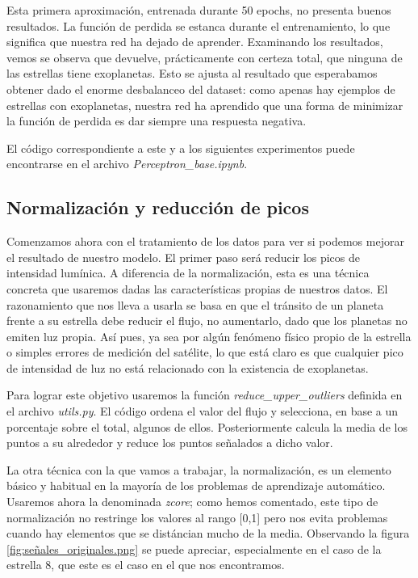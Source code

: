 Esta primera aproximación, entrenada durante 50 epochs, no presenta buenos resultados. La función de perdida se estanca durante el entrenamiento, lo que significa que nuestra red ha dejado de aprender. Examinando los resultados, vemos se observa que devuelve, prácticamente con certeza total, que ninguna de las estrellas tiene exoplanetas. Esto se ajusta al resultado que esperabamos obtener dado el enorme desbalanceo del dataset: como apenas hay ejemplos de estrellas con exoplanetas, nuestra red ha aprendido que una forma de minimizar la función de perdida es dar siempre una respuesta negativa.


El código correspondiente a este y a los siguientes experimentos puede encontrarse en el archivo \textit{Perceptron\_base.ipynb}.

\subsection{Normalización y reducción de picos}

Comenzamos ahora con el tratamiento de los datos para ver si podemos mejorar el resultado de nuestro modelo. El primer paso será reducir los picos de intensidad lumínica. A diferencia de la normalización, esta es una técnica concreta que usaremos dadas las características propias de nuestros datos. El razonamiento que nos lleva a usarla se basa en que el tránsito de un planeta frente a su estrella debe reducir el flujo, no aumentarlo, dado que los planetas no emiten luz propia. Así pues, ya sea por algún fenómeno físico propio de la estrella o simples errores de medición del satélite, lo que está claro es que cualquier pico de intensidad de luz no está relacionado con la existencia de exoplanetas.

Para lograr este objetivo usaremos la función \textit{reduce\_upper\_outliers} definida en el archivo \textit{utils.py}. El código ordena el valor del flujo y selecciona, en base a un porcentaje sobre el total, algunos de ellos. Posteriormente calcula la media de los puntos a su alrededor y reduce los puntos señalados a dicho valor.

La otra técnica con la que vamos a trabajar, la normalización, es un elemento básico y habitual en la mayoría de los problemas de aprendizaje automático. Usaremos ahora la denominada \textit{zcore}; como hemos comentado, este tipo de normalización no restringe los valores al rango [0,1] pero nos evita problemas cuando hay elementos que se distáncian mucho de la media. Observando la figura \ref{fig:señales_originales.png} se puede apreciar, especialmente en el caso de la estrella 8, que este es el caso en el que nos encontramos.

